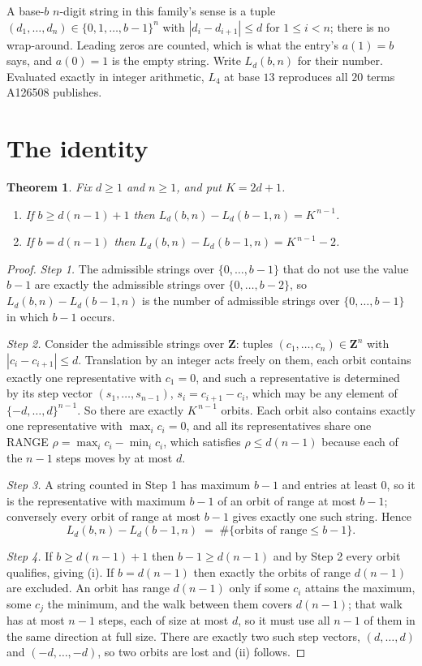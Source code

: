 \documentclass[11pt,a4paper]{article}
\theoremstyle{plain}
\newtheorem{theorem}{Theorem}
\theoremstyle{definition}
\begin{document}
A base-$b$ $n$-digit string in this family's sense is a tuple
$(d_1,\dots,d_n)\in\{0,1,\dots,b-1\}^{n}$ with $|d_i-d_{i+1}|\le d$ for $1\le i<n$; there
is no wrap-around. Leading zeros are counted, which is what the entry's $a(1)=b$ says, and
$a(0)=1$ is the empty string. Write $L_d(b,n)$ for their number. Evaluated exactly in integer
arithmetic, $L_{4}$ at base $13$ reproduces all $20$ terms A126508 publishes.

\section{The identity}

\begin{theorem}
Fix $d\ge1$ and $n\ge1$, and put $K=2d+1$.
\begin{enumerate}
\item[(i)] If $b\ge d(n-1)+1$ then $L_d(b,n)-L_d(b-1,n)=K^{\,n-1}$.
\item[(ii)] If $b=d(n-1)$ then $L_d(b,n)-L_d(b-1,n)=K^{\,n-1}-2$.
\end{enumerate}
\end{theorem}

\begin{proof}
\emph{Step 1.} The admissible strings over $\{0,\dots,b-1\}$ that do not use the value $b-1$
are exactly the admissible strings over $\{0,\dots,b-2\}$, so $L_d(b,n)-L_d(b-1,n)$ is the
number of admissible strings over $\{0,\dots,b-1\}$ in which $b-1$ occurs.

\emph{Step 2.} Consider the admissible strings over $\mathbf{Z}$: tuples
$(c_1,\dots,c_n)\in\mathbf{Z}^{n}$ with $|c_i-c_{i+1}|\le d$. Translation by an integer acts
freely on them, each orbit contains exactly one representative with $c_1=0$, and such a
representative is determined by its step vector $(s_1,\dots,s_{n-1})$, $s_i=c_{i+1}-c_i$,
which may be any element of $\{-d,\dots,d\}^{n-1}$. So there are exactly $K^{\,n-1}$ orbits.
Each orbit also contains exactly one representative with $\max_i c_i=0$, and all its
representatives share one RANGE $\rho=\max_ic_i-\min_ic_i$, which satisfies
$\rho\le d(n-1)$ because each of the $n-1$ steps moves by at most $d$.

\emph{Step 3.} A string counted in Step 1 has maximum $b-1$ and entries at least $0$, so it is
the representative with maximum $b-1$ of an orbit of range at most $b-1$; conversely every orbit
of range at most $b-1$ gives exactly one such string. Hence
\[
L_d(b,n)-L_d(b-1,n)\;=\;\#\{\text{orbits of range}\le b-1\} .
\]

\emph{Step 4.} If $b\ge d(n-1)+1$ then $b-1\ge d(n-1)$ and by Step 2 every orbit qualifies,
giving (i). If $b=d(n-1)$ then exactly the orbits of range $d(n-1)$ are excluded. An orbit has
range $d(n-1)$ only if some $c_i$ attains the maximum, some $c_j$ the minimum, and the walk
between them covers $d(n-1)$; that walk has at most $n-1$ steps, each of size at most $d$, so it
must use all $n-1$ of them in the same direction at full size. There are exactly two such step
vectors, $(d,\dots,d)$ and $(-d,\dots,-d)$, so two orbits are lost and (ii) follows.
\end{proof}
\end{document}
